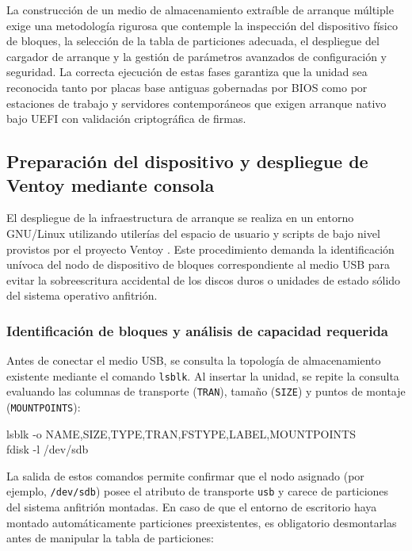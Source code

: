 \documentclass[12pt]{article}
\begin{document}
La construcción de un medio de almacenamiento extraíble de arranque múltiple exige una metodología rigurosa que contemple la inspección del dispositivo físico de bloques, la selección de la tabla de particiones adecuada, el despliegue del cargador de arranque y la gestión de parámetros avanzados de configuración y seguridad. La correcta ejecución de estas fases garantiza que la unidad sea reconocida tanto por placas base antiguas gobernadas por BIOS como por estaciones de trabajo y servidores contemporáneos que exigen arranque nativo bajo UEFI con validación criptográfica de firmas.

\subsection{Preparación del dispositivo y despliegue de Ventoy mediante consola}
\label{sec:preparacionConsola}

El despliegue de la infraestructura de arranque se realiza en un entorno GNU/Linux utilizando utilerías del espacio de usuario y scripts de bajo nivel provistos por el proyecto Ventoy \parencite{ventoy2024documentation}. Este procedimiento demanda la identificación unívoca del nodo de dispositivo de bloques correspondiente al medio USB para evitar la sobreescritura accidental de los discos duros o unidades de estado sólido del sistema operativo anfitrión.

\subsubsection{Identificación de bloques y análisis de capacidad requerida}

Antes de conectar el medio USB, se consulta la topología de almacenamiento existente mediante el comando \texttt{lsblk}. Al insertar la unidad, se repite la consulta evaluando las columnas de transporte (\texttt{TRAN}), tamaño (\texttt{SIZE}) y puntos de montaje (\texttt{MOUNTPOINTS}):

\begin{mdframed}[style=terminal]
\ttfamily\upshape\color{bashLetterColor}\footnotesize
lsblk -o NAME,SIZE,TYPE,TRAN,FSTYPE,LABEL,MOUNTPOINTS \\
fdisk -l /dev/sdb
\end{mdframed}

La salida de estos comandos permite confirmar que el nodo asignado (por ejemplo, \texttt{/dev/sdb}) posee el atributo de transporte \texttt{usb} y carece de particiones del sistema anfitrión montadas. En caso de que el entorno de escritorio haya montado automáticamente particiones preexistentes, es obligatorio desmontarlas antes de manipular la tabla de particiones:
\end{document}
